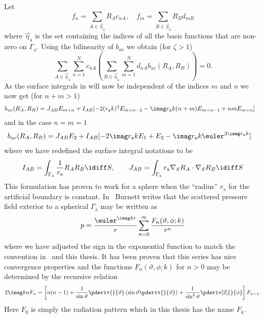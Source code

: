 Let
\begin{equation*}
	f_n = \sum_{A\in\vec{\eta}_{\mathrm{a}}} R_A c_{nA},\quad f_m = \sum_{B\in\vec{\eta}_{\mathrm{a}}} R_B d_{mB}
\end{equation*}
where $\vec{\eta}_{\mathrm{a}}$ is the set containing the indices of all the basis functions that are non-zero on $\Gamma_{\mathrm{a}}$. Using the bilinearity of $b_{uc}$ we obtain (for $\zeta > 1$)
\begin{equation*}
	\sum_{A\in\vec{\eta}_{\mathrm{a}}}\sum_{n=1}^N c_{nA}\left(\sum_{B\in\vec{\eta}_{\mathrm{a}}}\sum_{m=1}^N d_{nA} b_{uc}(R_A, R_B)\right) = 0.
\end{equation*}
As the surface integrals in  will now be independent of the indices $m$ and $n$ we now get (for $n+m>1$)
\begin{align*}
	b_{uc}(R_A,R_B) &= J_{AB}E_{m+n}+ I_{AB}[-2(r_{\mathrm{a}} k)^2E_{m+n-2} - \imag r_{\mathrm{a}} k(n+m)E_{m+n-1} + nm E_{m+n}]
\end{align*}
and in the case $n=m=1$
\begin{align*}
	b_{uc}(R_A,R_B) &= J_{AB}E_{2} + I_{AB}[- 2\imag r_{\mathrm{a}} kE_{1} + E_{2}- \imag r_{\mathrm{a}} k \euler^{2\imag r_{\mathrm{a}} k}] 
\end{align*}
where we have redefined the surface integral notations to be
\begin{equation*}
	I_{AB} = \int_{\Gamma_{\mathrm{a}}} \frac{1}{r_{\mathrm{a}}} R_A R_B\idiff S,\qquad J_{AB} = \int_{\Gamma_{\mathrm{a}}} r_{\mathrm{a}} \nabla_S R_A \cdot\nabla_S R_B\idiff S
\end{equation*}
This formulation has proven to work for a sphere when the ``radius'' $r_{\mathrm{a}}$ for the artificial boundary is constant. In~\cite{Burnett1994atd} Burnett writes that the scattered pressure field exterior to a spherical $\Gamma_{\mathrm{a}}$ may be written as
\begin{equation*}
	p = \frac{\euler^{\imag kr}}{r}\sum_{n=0}^\infty \frac{F_n(\vartheta,\phi; k)}{r^n}
\end{equation*}
where we have adjusted the sign in the exponential function to match the convention in~\cite{Ihlenburg1998fea} and this thesis. It has been proven that this series has nice convergence properties and the functions $F_n(\vartheta,\phi;k)$ for $n>0$ may be determined by the recursive relation
\begin{equation*}
	2\imag knF_n = \left[n(n-1) + \frac{1}{\sin\vartheta}\pderiv{}{\vartheta}\left(\sin\vartheta\pderiv{}{\vartheta}\right) + \frac{1}{\sin^2\vartheta}\pderiv[2]{}{\phi}\right]F_{n-1}.
\end{equation*}
Here $F_0$ is simply the radiation pattern which in this thesis has the name $F_k$.


